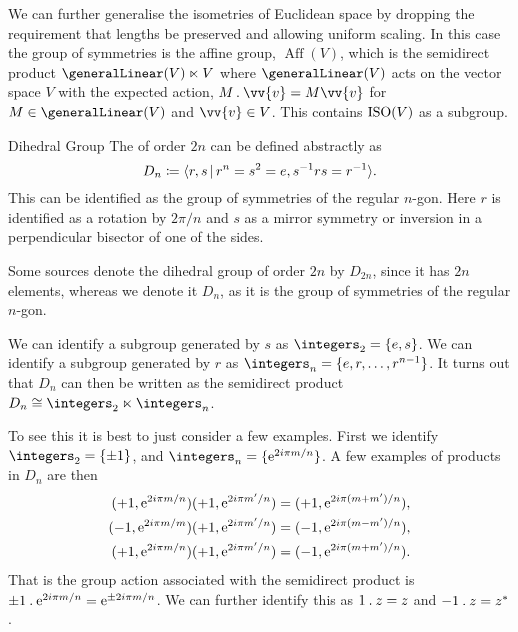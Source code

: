 We can further generalise the isometries of Euclidean space by dropping the requirement that lengths be preserved and allowing uniform scaling.
In this case the group of symmetries is the affine group, \(\mathop{\mathrm{Aff}}(V)\), which is the semidirect product \(\generalLinear(V) \ltimes V\) where \(\generalLinear(V)\) acts on the vector space \(V\) with the expected action, \(M\action \vv{v} = M\vv{v}\) for \(M\in\generalLinear(V)\) and \(\vv{v} \in V\).
This contains \(\operatorname{ISO}(V)\) as a subgroup.

\begin{exm}{Dihedral Group}{}
    The  of order \(2n\) can be defined abstractly as
    \begin{equation}
        D_n \coloneqq \presentation{r, s}{r^n = s^2 = e, s^{-1}rs = r^{-1}}.
    \end{equation}
    This can be identified as the group of symmetries of the regular \(n\)-gon.
    Here \(r\) is identified as a rotation by \(2\pi/n\) and \(s\) as a mirror symmetry or inversion in a perpendicular bisector of one of the sides.
    
    \begin{wrn}
        Some sources denote the dihedral group of order \(2n\) by \(D_{2n}\), since it has \(2n\) elements, whereas we denote it \(D_{n}\), as it is the group of symmetries of the regular \(n\)-gon.
    \end{wrn}
    
    We can identify a subgroup generated by \(s\) as \(\integers_2 = \{e, s\}\).
    We can identify a subgroup generated by \(r\) as \(\integers_n = \{e, r, \dotsc, r^{n-1}\}\).
    It turns out that \(D_n\) can then be written as the semidirect product \(D_n \isomorphic \integers_2 \ltimes \integers_n\).
    
    To see this it is best to just consider a few examples.
    First we identify \(\integers_2 = \{\pm 1\}\), and \(\integers_n = \{\e^{2i\pi m/n}\}\).
    A few examples of products in \(D_n\) are then
    \begin{align}
        (+1, \mathrm{e}^{2i\pi m/n})(+1, \mathrm{e}^{2i\pi m'/n}) &= (+1, \mathrm{e}^{2i\pi(m + m')/n}),\\
        (-1, \mathrm{e}^{2i\pi m/m})(+1, \mathrm{e}^{2i\pi m'/n}) &= (-1, \mathrm{e}^{2i\pi(m - m')/n}),\\
        (+1, \mathrm{e}^{2i\pi m/n})(+1, \mathrm{e}^{2i\pi m'/n}) &= (-1, \mathrm{e}^{2i\pi(m + m')/n}).
    \end{align}
    That is the group action associated with the semidirect product is \(\pm 1 \mathbin{.} \mathrm{e}^{2i\pi m/n} = \mathrm{e}^{\pm 2i\pi m/n}\).
    We can further identify this as \(1\mathbin{.} z = z\) and \(-1\mathbin{.} z = z^*\).
\end{exm}

